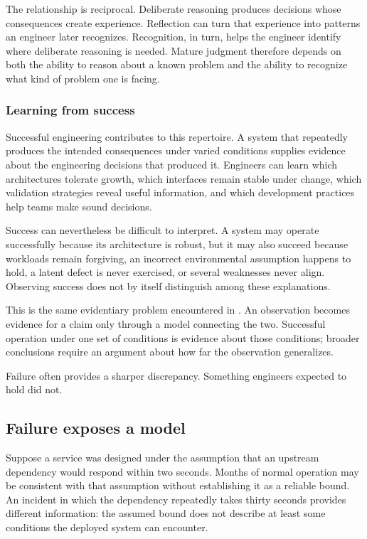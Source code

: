 The relationship is reciprocal. Deliberate reasoning produces decisions whose consequences create
experience. Reflection can turn that experience into patterns an engineer later recognizes.
Recognition, in turn, helps the engineer identify where deliberate reasoning is needed. Mature
judgment therefore depends on both the ability to reason about a known problem and the ability to
recognize what kind of problem one is facing.

\subsubsection{Learning from success}\label{sec-learning-from-success}

Successful engineering contributes to this repertoire. A system that repeatedly produces the
intended consequences under varied conditions supplies evidence about the engineering decisions
that produced it. Engineers can learn which architectures tolerate growth, which interfaces remain
stable under change, which validation strategies reveal useful information, and which development
practices help teams make sound decisions.

Success can nevertheless be difficult to interpret. A system may operate successfully because its
architecture is robust, but it may also succeed because workloads remain forgiving, an incorrect
environmental assumption happens to hold, a latent defect is never exercised, or several weaknesses
never align. Observing success does not by itself distinguish among these explanations.

This is the same evidentiary problem encountered in \citet{ch-validation}. An observation becomes evidence
for a claim only through a model connecting the two. Successful operation under one set of
conditions is evidence about those conditions; broader conclusions require an argument about how
far the observation generalizes.

Failure often provides a sharper discrepancy. Something engineers expected to hold did not.

\subsection{Failure exposes a model}\label{sec-failure-exposes-model}

Suppose a service was designed under the assumption that an upstream dependency would respond
within two seconds. Months of normal operation may be consistent with that assumption without
establishing it as a reliable bound. An incident in which the dependency repeatedly takes thirty
seconds provides different information: the assumed bound does not describe at least some
conditions the deployed system can encounter.

